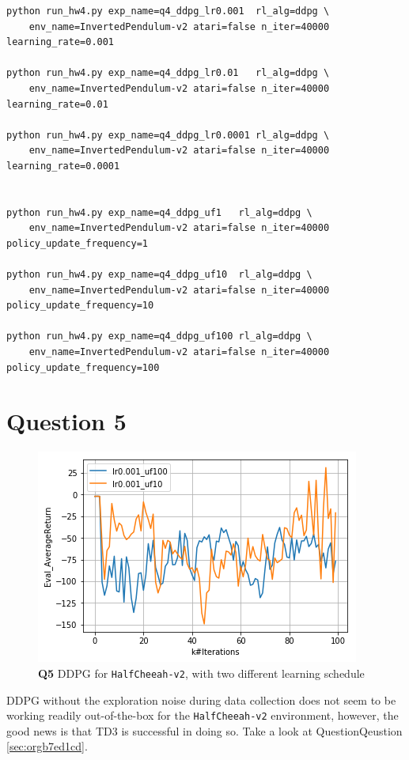 \documentclass[11pt]{article}
\begin{document}
\begin{verbatim}
python run_hw4.py exp_name=q4_ddpg_lr0.001  rl_alg=ddpg \
    env_name=InvertedPendulum-v2 atari=false n_iter=40000 learning_rate=0.001

python run_hw4.py exp_name=q4_ddpg_lr0.01   rl_alg=ddpg \
    env_name=InvertedPendulum-v2 atari=false n_iter=40000 learning_rate=0.01

python run_hw4.py exp_name=q4_ddpg_lr0.0001 rl_alg=ddpg \
    env_name=InvertedPendulum-v2 atari=false n_iter=40000 learning_rate=0.0001


python run_hw4.py exp_name=q4_ddpg_uf1   rl_alg=ddpg \
    env_name=InvertedPendulum-v2 atari=false n_iter=40000 policy_update_frequency=1

python run_hw4.py exp_name=q4_ddpg_uf10  rl_alg=ddpg \
    env_name=InvertedPendulum-v2 atari=false n_iter=40000 policy_update_frequency=10

python run_hw4.py exp_name=q4_ddpg_uf100 rl_alg=ddpg \
    env_name=InvertedPendulum-v2 atari=false n_iter=40000 policy_update_frequency=100
\end{verbatim}

\clearpage


\section{Question 5}
\label{sec:org5cee36f}

\begin{figure}[htbp]
\centering
\includegraphics[width=.9\linewidth]{./5.png}
\caption{\textbf{Q5} DDPG for \texttt{HalfCheeah-v2}, with two different learning schedule}
\end{figure}

DDPG without the exploration noise during data collection does not seem to be working readily out-of-the-box for the \texttt{HalfCheeah-v2} environment, however, the good news is that TD3 is successful in doing so. Take a look at QuestionQeustion \ref{sec:orgb7ed1cd}.
\end{document}
